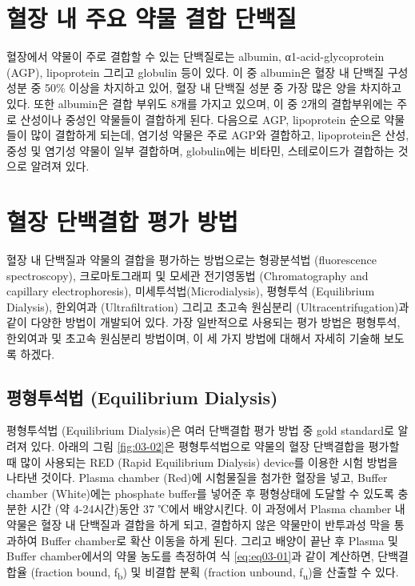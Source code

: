 \documentclass[
  11pt,
  krantz2, a4paper, twoside]{krantz}
\begin{document}
\hypertarget{uxd608uxc7a5-uxb0b4-uxc8fcuxc694-uxc57duxbb3c-uxacb0uxd569-uxb2e8uxbc31uxc9c8}{%
\section{혈장 내 주요 약물 결합 단백질}\label{uxd608uxc7a5-uxb0b4-uxc8fcuxc694-uxc57duxbb3c-uxacb0uxd569-uxb2e8uxbc31uxc9c8}}

혈장에서 약물이 주로 결합할 수 있는 단백질로는 albumin,
α1-acid-glycoprotein (AGP), lipoprotein 그리고 globulin 등이 있다. 이 중
albumin은 혈장 내 단백질 구성 성분 중 50\% 이상을 차지하고 있어, 혈장 내
단백질 성분 중 가장 많은 양을 차지하고 있다. 또한 albumin은 결합 부위도
8개를 가지고 있으며, 이 중 2개의 결합부위에는 주로 산성이나 중성인
약물들이 결합하게 된다. 다음으로 AGP, lipoprotein 순으로 약물들이 많이
결합하게 되는데, 염기성 약물은 주로 AGP와 결합하고, lipoprotein은 산성,
중성 및 염기성 약물이 일부 결합하며, globulin에는 비타민, 스테로이드가
결합하는 것으로 알려져 있다.

\hypertarget{uxd608uxc7a5-uxb2e8uxbc31uxacb0uxd569-uxd3c9uxac00-uxbc29uxbc95}{%
\section{혈장 단백결합 평가 방법}\label{uxd608uxc7a5-uxb2e8uxbc31uxacb0uxd569-uxd3c9uxac00-uxbc29uxbc95}}

혈장 내 단백질과 약물의 결합을 평가하는 방법으로는 형광분석법
(fluorescence spectroscopy), 크로마토그래피 및 모세관 전기영동법
(Chromatography and capillary electrophoresis),
미세투석법(Microdialysis), 평형투석 (Equilibrium Dialysis), 한외여과
(Ultrafiltration) 그리고 초고속 원심분리 (Ultracentrifugation)과 같이
다양한 방법이 개발되어 있다. 가장 일반적으로 사용되는 평가 방법은
평형투석, 한외여과 및 초고속 원심분리 방법이며, 이 세 가지 방법에 대해서
자세히 기술해 보도록 하겠다.

\hypertarget{uxd3c9uxd615uxd22cuxc11duxbc95-equilibrium-dialysis}{%
\subsection{평형투석법 (Equilibrium Dialysis)}\label{uxd3c9uxd615uxd22cuxc11duxbc95-equilibrium-dialysis}}

평형투석법 (Equilibrium Dialysis)은 여러 단백결합 평가 방법 중 gold
standard로 알려져 있다. 아래의 그림 \ref{fig:03-02}은 평형투석법으로 약물의 혈장
단백결합을 평가할 때 많이 사용되는 RED (Rapid Equilibrium Dialysis)
device를 이용한 시험 방법을 나타낸 것이다. Plasma chamber (Red)에
시험물질을 첨가한 혈장을 넣고, Buffer chamber (White)에는 phosphate
buffer를 넣어준 후 평형상태에 도달할 수 있도록 충분한 시간 (약
4-24시간)동안 37 ℃에서 배양시킨다. 이 과정에서 Plasma chamber 내 약물은
혈장 내 단백질과 결합을 하게 되고, 결합하지 않은 약물만이 반투과성 막을
통과하여 Buffer chamber로 확산 이동을 하게 된다. 그리고 배양이 끝난 후
Plasma 및 Buffer chamber에서의 약물 농도를 측정하여 식 \eqref{eq:eq03-01}과 같이
계산하면, 단백결합율 (fraction bound, f\textsubscript{b}) 및 비결합 분획 (fraction
unbound, f\textsubscript{u})을 산출할 수 있다.
\end{document}
